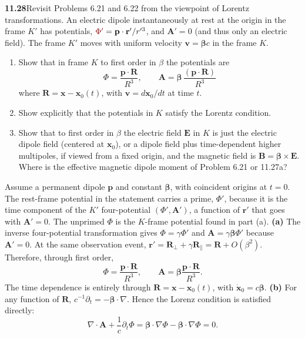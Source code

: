 \par\bigskip
\noindent\textbf{11.28}\quad Revisit Problems 6.21 and 6.22 from the viewpoint of Lorentz transformations. An electric dipole instantaneously at rest at the origin in the frame $K'$ has potentials, $\erratum{\Phi'}=\mathbf{p}\cdot\mathbf{r}'/r'^{3}$, and $\mathbf{A}'=0$ (and thus only an electric field). The frame $K'$ moves with uniform velocity $\mathbf{v}=\boldsymbol{\beta}c$ in the frame $K$.
\begin{enumerate}
\item[(a)] Show that in frame $K$ to first order in $\beta$ the potentials are
\[
\Phi=\frac{\mathbf{p}\cdot\mathbf{R}}{R^{3}},\qquad
\mathbf{A}=\boldsymbol{\beta}\,\frac{(\mathbf{p}\cdot\mathbf{R})}{R^{3}}
\]
where $\mathbf{R}=\mathbf{x}-\mathbf{x}_{0}(t)$, with $\mathbf{v}=d\mathbf{x}_{0}/dt$ at time $t$.
\item[(b)] Show explicitly that the potentials in $K$ satisfy the Lorentz condition.
\item[(c)] Show that to first order in $\beta$ the electric field $\mathbf{E}$ in $K$ is just the electric dipole field (centered at $\mathbf{x}_{0}$), or a dipole field plus time-dependent higher multipoles, if viewed from a fixed origin, and the magnetic field is $\mathbf{B}=\boldsymbol{\beta}\times\mathbf{E}$. Where is the effective magnetic dipole moment of Problem 6.21 or 11.27a?
\end{enumerate}
\solution
Assume a permanent dipole $\mathbf p$ and constant
$\boldsymbol\beta$, with coincident origins at $t=0$.
The rest-frame potential in the statement carries a prime,
$\Phi'$, because it is the time component of the $K'$
four-potential $(\Phi',\mathbf A')$, a function of $\mathbf r'$
that goes with $\mathbf A'=0$. The unprimed $\Phi$ is the
$K$-frame potential found in part (a).
\textbf{(a)} The inverse four-potential transformation gives
$\Phi=\gamma\Phi'$ and $\mathbf A=\gamma\boldsymbol\beta\Phi'$
because $\mathbf A'=0$. At the same observation event,
$\mathbf r'=\mathbf R_\perp+\gamma\mathbf R_\parallel
=\mathbf R+O(\beta^2)$. Therefore, through first order,
\[
\boxed{\Phi=\frac{\mathbf p\cdot\mathbf R}{R^3},\qquad
\mathbf A=\boldsymbol\beta\frac{\mathbf p\cdot\mathbf R}{R^3}.}
\]
The time dependence is entirely through
$\mathbf R=\mathbf x-\mathbf x_0(t)$, with
$\dot{\mathbf x}_0=c\boldsymbol\beta$.
\textbf{(b)} For any function of $\mathbf R$,
$c^{-1}\partial_t=-\boldsymbol\beta\cdot\nabla$. Hence the
Lorenz condition is satisfied directly:
\[
\boxed{\nabla\cdot\mathbf A+\frac1c\partial_t\Phi
=\boldsymbol\beta\cdot\nabla\Phi-
\boldsymbol\beta\cdot\nabla\Phi=0.}
\]

